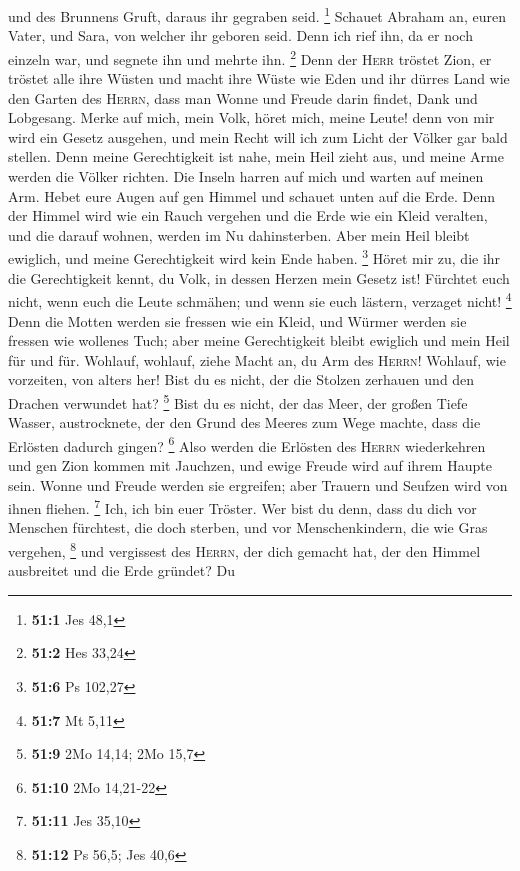 und des Brunnens Gruft, daraus ihr gegraben seid. \footnote{\textbf{51:1}
  Jes 48,1}  Schauet Abraham an, euren Vater, und Sara,
von welcher ihr geboren seid. Denn ich rief ihn, da er noch einzeln war,
und segnete ihn und mehrte ihn. \footnote{\textbf{51:2} Hes 33,24}
 Denn der \textsc{Herr} tröstet Zion, er tröstet alle ihre
Wüsten und macht ihre Wüste wie Eden und ihr dürres Land wie den Garten
des \textsc{Herrn}, dass man Wonne und Freude darin findet, Dank und
Lobgesang.  Merke auf mich, mein Volk, höret mich, meine
Leute! denn von mir wird ein Gesetz ausgehen, und mein Recht will ich
zum Licht der Völker gar bald stellen.  Denn meine
Gerechtigkeit ist nahe, mein Heil zieht aus, und meine Arme werden die
Völker richten. Die Inseln harren auf mich und warten auf meinen Arm.
 Hebet eure Augen auf gen Himmel und schauet unten auf die
Erde. Denn der Himmel wird wie ein Rauch vergehen und die Erde wie ein
Kleid veralten, und die darauf wohnen, werden im Nu dahinsterben. Aber
mein Heil bleibt ewiglich, und meine Gerechtigkeit wird kein Ende haben.
\footnote{\textbf{51:6} Ps 102,27}  Höret mir zu, die ihr
die Gerechtigkeit kennt, du Volk, in dessen Herzen mein Gesetz ist!
Fürchtet euch nicht, wenn euch die Leute schmähen; und wenn sie euch
lästern, verzaget nicht! \footnote{\textbf{51:7} Mt 5,11} 
Denn die Motten werden sie fressen wie ein Kleid, und Würmer werden sie
fressen wie wollenes Tuch; aber meine Gerechtigkeit bleibt ewiglich und
mein Heil für und für.  Wohlauf, wohlauf, ziehe Macht an,
du Arm des \textsc{Herrn}! Wohlauf, wie vorzeiten, von alters her! Bist
du es nicht, der die Stolzen zerhauen und den Drachen verwundet hat?
\footnote{\textbf{51:9} 2Mo 14,14; 2Mo 15,7}  Bist du es
nicht, der das Meer, der großen Tiefe Wasser, austrocknete, der den
Grund des Meeres zum Wege machte, dass die Erlösten dadurch gingen?
\footnote{\textbf{51:10} 2Mo 14,21-22}  Also werden die
Erlösten des \textsc{Herrn} wiederkehren und gen Zion kommen mit
Jauchzen, und ewige Freude wird auf ihrem Haupte sein. Wonne und Freude
werden sie ergreifen; aber Trauern und Seufzen wird von ihnen fliehen.
\footnote{\textbf{51:11} Jes 35,10}  Ich, ich bin euer
Tröster. Wer bist du denn, dass du dich vor Menschen fürchtest, die doch
sterben, und vor Menschenkindern, die wie Gras vergehen, \footnote{\textbf{51:12}
  Ps 56,5; Jes 40,6}  und vergissest des \textsc{Herrn},
der dich gemacht hat, der den Himmel ausbreitet und die Erde gründet? Du
